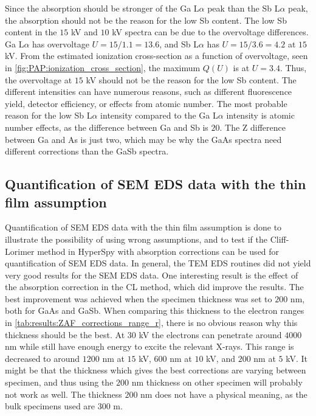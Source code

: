 Since the absorption should be stronger of the Ga L$\alpha$ peak than the Sb L$\alpha$ peak, the absorption should not be the reason for the low Sb content.
The low Sb content in the $15$ kV and $10$ kV spectra can be due to the overvoltage differences.
Ga L$\alpha$ has overvoltage $U = 15/1.1 = 13.6$, and Sb L$\alpha$ has $U = 15/3.6 = 4.2$ at $15$ kV.
From the estimated ionization cross-section as a function of overvoltage, seen in \cref{fig:PAP:ionization_cross_section}, the maximum $Q(U)$ is at $U = 3.4$.
Thus, the overvoltage at $15$ kV should not be the reason for the low Sb content.
The different intensities can have numerous reasons, such as different fluorescence yield, detector efficiency, or effects from atomic number.
The most probable reason for the low Sb L$\alpha$ intensity compared to the Ga L$\alpha$ intensity is atomic number effects, as the difference between Ga and Sb is $20$.
The Z difference between Ga and As is just two, which may be why the GaAs spectra need different corrections than the GaSb spectra.





\subsection{Quantification of SEM EDS data with the thin film assumption}
\label{discussion:quantitative:thin_film_assumption}

Quantification of SEM EDS data with the thin film assumption is done to illustrate the possibility of using wrong assumptions, and to test if the Cliff-Lorimer method in HyperSpy with absorption corrections can be used for quantification of SEM EDS data.
In general, the TEM EDS routines did not yield very good results for the SEM EDS data.
One interesting result is the effect of the absorption correction in the CL method, which did improve the results.
The best improvement was achieved when the specimen thickness was set to $200$ nm, both for GaAs and GaSb.
When comparing this thickness to the electron ranges in \cref{tab:results:ZAF_corrections_range_r}, there is no obvious reason why this thickness should be the best.
At $30$ kV the electrons can penetrate around $4000$ nm while still have enough energy to excite the relevant X-rays.
This range is decreased to around $1200$ nm at $15$ kV, $600$ nm at $10$ kV, and $200$ nm at $5$ kV.
It might be that the thickness which gives the best corrections are varying between specimen, and thus using the $200$ nm thickness on other specimen will probably not work as well.
The thickness $200$ nm does not have a physical meaning, as the bulk specimens used are $300$ \textmu m.

